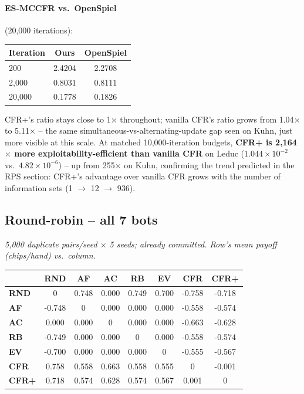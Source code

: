 \documentclass[11pt]{article}
\newcommand{\highlight}[1]{\textbf{#1}}
\begin{document}
\paragraph{ES-MCCFR vs.\ OpenSpiel} (20{,}000 iterations):
\begin{center}
\begin{tabular}{lcc}
\toprule
Iteration & Ours & OpenSpiel \\
\midrule
200 & 2.4204 & 2.2708 \\
2{,}000 & 0.8031 & 0.8111 \\
20{,}000 & 0.1778 & 0.1826 \\
\bottomrule
\end{tabular}
\end{center}

CFR+'s ratio stays close to 1$\times$ throughout; vanilla CFR's ratio grows from
1.04$\times$ to 5.11$\times$ -- the same simultaneous-vs-alternating-update gap seen
on Kuhn, just more visible at this scale. At matched 10{,}000-iteration budgets,
\highlight{CFR+ is 2{,}164$\times$ more exploitability-efficient than vanilla CFR} on
Leduc ($1.044\times10^{-2}$ vs.\ $4.82\times10^{-6}$) -- up from 255$\times$ on Kuhn,
confirming the trend predicted in the RPS section: CFR+'s advantage over vanilla CFR
grows with the number of information sets (1 $\rightarrow$ 12 $\rightarrow$ 936).

\subsection*{Round-robin -- all 7 bots}
\emph{5{,}000 duplicate pairs/seed $\times$ 5 seeds; already committed. Row's mean
payoff (chips/hand) vs.\ column.}

\begin{center}
\begin{tabular}{lccccccc}
\toprule
 & RND & AF & AC & RB & EV & CFR & CFR+ \\
\midrule
\textbf{RND} & 0 & 0.748 & 0.000 & 0.749 & 0.700 & -0.758 & -0.718 \\
\textbf{AF} & -0.748 & 0 & 0.000 & 0.000 & 0.000 & -0.558 & -0.574 \\
\textbf{AC} & 0.000 & 0.000 & 0 & 0.000 & 0.000 & -0.663 & -0.628 \\
\textbf{RB} & -0.749 & 0.000 & 0.000 & 0 & 0.000 & -0.558 & -0.574 \\
\textbf{EV} & -0.700 & 0.000 & 0.000 & 0.000 & 0 & -0.555 & -0.567 \\
\textbf{CFR} & 0.758 & 0.558 & 0.663 & 0.558 & 0.555 & 0 & -0.001 \\
\textbf{CFR+} & 0.718 & 0.574 & 0.628 & 0.574 & 0.567 & 0.001 & 0 \\
\bottomrule
\end{tabular}
\end{center}
\end{document}
